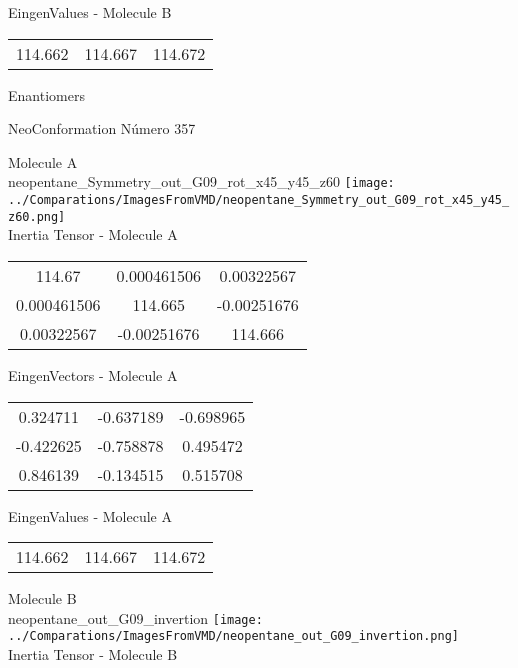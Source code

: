 \begin{multicols}{2}
\begin{center}
\vtab
 EingenValues - Molecule B     \\
\vtab
\begin{tabular}{|c c c|}
114.662	 & 	114.667	 & 	114.672	 \\
\end{tabular}

\end{center}
\end{multicols}
\begin{center}
\vtab
\vtab
\textcolor{NavyBlue}{\Large Enantiomers}
\end{center}

 \newpage

\vtab[-2cm]
\begin{center}
{\large NeoConformation \tab Número 357}
\end{center}
\begin{multicols}{2}
\begin{center}

Molecule A \\ 
neopentane\_Symmetry\_out\_G09\_rot\_x45\_y45\_z60
\texttt{[image: ../Comparations/ImagesFromVMD/neopentane\_Symmetry\_out\_G09\_rot\_x45\_y45\_z60.png]}
\\
Inertia Tensor - Molecule A \\
\vtab

\begin{tabular}{|c c c|}
114.67	 & 	0.000461506	 & 	0.00322567	 \\
0.000461506	 & 	114.665	 & 	-0.00251676	 \\
0.00322567	 & 	-0.00251676	 & 	114.666
\end{tabular}

\vtab
 EingenVectors - Molecule A     \\
\vtab
\begin{tabular}{|c c c|}
0.324711	 & 	-0.637189	 & 	-0.698965	 \\
-0.422625	 & 	-0.758878	 & 	0.495472	 \\
0.846139	 & 	-0.134515	 & 	0.515708
\end{tabular}

\vtab
 EingenValues - Molecule A     \\
\vtab
\begin{tabular}{|c c c|}
114.662	 & 	114.667	 & 	114.672	 \\
\end{tabular}
\columnbreak

Molecule B \\ 
neopentane\_out\_G09\_invertion
\texttt{[image: ../Comparations/ImagesFromVMD/neopentane\_out\_G09\_invertion.png]}
\\
Inertia Tensor - Molecule B \\
\vtab


\end{center}
\end{multicols}
